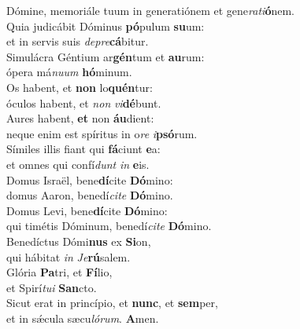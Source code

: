 \oddverse Dómine, memoriále tuum in generatiónem et gene\textit{ra}\textit{ti}\textbf{ó}nem.\\
\evenverse Quia judicábit Dóminus \textbf{pó}pulum \textbf{su}um:~\*\\
\evenverse et in servis suis \textit{de}\textit{pre}\textbf{cá}bitur.\\
\oddverse Simulácra Géntium ar\textbf{gén}tum et \textbf{au}rum:~\*\\
\oddverse ópera má\textit{nu}\textit{um} \textbf{hó}minum.\\
\evenverse Os habent, et \textbf{non} lo\textbf{quén}tur:~\*\\
\evenverse óculos habent, et \textit{non} \textit{vi}\textbf{dé}bunt.\\
\oddverse Aures habent, \textbf{et} non \textbf{áu}dient:~\*\\
\oddverse neque enim est spíritus in o\textit{re} \textit{i}\textbf{psó}rum.\\
\evenverse Símiles illis fiant qui \textbf{fá}ciunt \textbf{e}a:~\*\\
\evenverse et omnes qui confí\textit{dunt} \textit{in} \textbf{e}is.\\
\oddverse Domus Israël, bene\textbf{dí}cite \textbf{Dó}mino:~\*\\
\oddverse domus Aaron, benedí\textit{ci}\textit{te} \textbf{Dó}mino.\\
\evenverse Domus Levi, bene\textbf{dí}cite \textbf{Dó}mino:~\*\\
\evenverse qui timétis Dóminum, benedí\textit{ci}\textit{te} \textbf{Dó}mino.\\
\oddverse Benedíctus Dómi\textbf{nus} ex \textbf{Si}on,~\*\\
\oddverse qui hábitat \textit{in} \textit{Je}\textbf{rú}salem.\\
\evenverse Glória \textbf{Pa}tri, et \textbf{Fí}lio,~\*\\
\evenverse et Spirí\textit{tu}\textit{i} \textbf{San}cto.\\
\oddverse Sicut erat in princípio, et \textbf{nunc}, et \textbf{sem}per,~\*\\
\oddverse et in sǽcula sæcu\textit{ló}\textit{rum}. \textbf{A}men.\\
